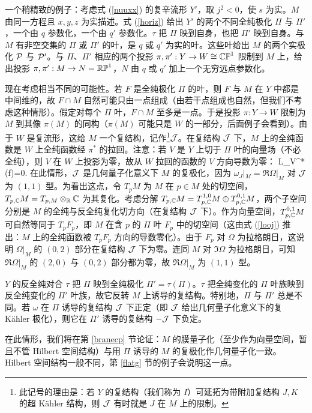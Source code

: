 一个稍精致的例子：考虑式 (\ref{nuuxx}) 的复辛流形 $Y'$，取 $j^2<0$，使 $s$ 为实。$M$ 由同一方程且 $x,y,z$ 为实描述。式 (\ref{horiz}) 给出 $Y'$ 的两个不同全纯极化 $\varPi$ 与 $\varPi'$，一个由 $q$ 参数化，一个由 $q'$ 参数化。$\tau$ 把 $\varPi$ 映到自身，也把 $\varPi'$ 映到自身。与 $M$ 有非空交集的 $\varPi$ 或 $\varPi'$ 的叶，是 $q$ 或 $q'$ 为实的叶。这些叶给出 $M$ 的两个实极化 $\P$ 与 $\P'$。与 $\varPi$、$\varPi'$ 相应的两个投影 $\pi,\pi':Y\to W\cong\bCP^1$ 限制到 $M$ 上，给出投影 $\pi,\pi':M\to N=\RP^1$，$N$ 由 $q$ 或 $q'$ 加上一个无穷远点参数化。

现在考虑相当不同的可能性。若 $F$ 是全纯极化 $\varPi$ 的叶，则 $F$ 与 $M$ 在 $Y$ 中都是中间维的，故 $F\cap M$ 自然可能只由一点组成（由若干点组成也自然，但我们不考虑这种情形）。假定对每个 $\varPi$ 叶，$F\cap M$ 至多是一点。于是投影 $\pi:Y\to W$ 限制为 $M$ 到其像 $\pi(M)$ 的同构（$\pi(M)$ 可能只是 $W$ 的一部分，后面例子会看到）。由于 $W$ 是复流形，这给 $M$ 一个复结构，记作\footnote{此记号的理由是：若 $Y$ 的复结构（我们称为 $I$）可延拓为带附加复结构 $J,K$ 的超 Kähler 结构，则 $\J$ 有时就是 $J$ 在 $M$ 上的限制。}$\J$。在复结构 $\J$ 下，$M$ 上的全纯函数是 $W$ 上全纯函数经 $\pi^*$ 的拉回。注意：若 $V$ 是 $Y$ 上切于 $\varPi$ 叶的向量场（不必全纯），则 $V$ 在 $W$ 上投影为零，故从 $W$ 拉回的函数的 $V$ 方向导数为零：
\be\label{looj} \mathcal L_V\cdot\pi^*(f)=0. \ee
在此情形，$\J$ 是几何量子化意义下 $M$ 的复极化，因为 $\omega_J|_M=\Re\Omega|_M$ 对 $\J$ 为 $(1,1)$ 型。为看出这点，令 $T_pM$ 为 $M$ 在 $p\in M$ 处的切空间，$T_{p,\C}M=T_{p,M}\otimes_\R\C$ 为其复化。考虑分解 $T_{p,\C}M=T^{1,0}_{p,\C}M\oplus T^{0,1}_{p,\C}M$，两个子空间分别是 $M$ 的全纯与反全纯复化切方向（在复结构 $\J$ 下）。作为向量空间，$T^{0,1}_{p,\C}M$ 可自然等同于 $T_pF_p$，即 $M$ 在含 $p$ 的 $\varPi$ 叶 $F_p$ 中的切空间（这由式 (\ref{looj}) 推出：$M$ 上的全纯函数被 $T_pF_p$ 方向的导数零化）。由于 $F_p$ 对 $\Omega$ 为拉格朗日，这说明 $\Omega|_M$ 的 $(0,2)$ 部分在复结构 $\J$ 下为零。连同 $M$ 对 $\Im\Omega$ 为拉格朗日，可知 $\Re\Omega|_M$ 的 $(2,0)$ 与 $(0,2)$ 部分都为零，故 $\Re\Omega|_M$ 为 $(1,1)$ 型。

$Y$ 的反全纯对合 $\tau$ 把 $\varPi$ 映到全纯极化 $\varPi'=\tau(\varPi)$。$\tau$ 把全纯变化的 $\varPi$ 叶族映到反全纯变化的 $\varPi'$ 叶族，故它反转 $M$ 上诱导的复结构。特别地，$\varPi$ 与 $\varPi'$ 总是不同。若 $\omega$ 在 $\varPi$ 诱导的复结构 $\J$ 下正定（即 $\J$ 给出几何量子化意义下的复 Kähler 极化），则它在 $\varPi'$ 诱导的复结构 $-\J$ 下负定。

在此情形，我们将在第 \ref{branecp} 节论证：$M$ 的膜量子化（至少作为向量空间，暂且不管 Hilbert 空间结构）与用 $\varPi$ 诱导的 $M$ 的复极化作几何量子化一致。Hilbert 空间结构一般不同，第 \ref{flatg} 节的例子会说明这一点。

